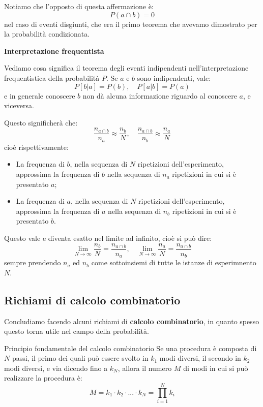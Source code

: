 \documentclass[a4paper,11pt]{article}
\begin{document}
Notiamo che l'opposto di questa affermazione è:
$$
P(a \cap b) = 0
$$
nel caso di eventi disgiunti, che era il primo teorema che avevamo dimostrato per la probabilità condizionata. 

\par\smallskip

\noindent
\textbf{\textsf{Interpretazione frequentista}}

\noindent
Vediamo cosa significa il teorema degli eventi indipendenti nell'interpretazione frequentistica della probabilità $P$. Se $a$ e $b$ sono indipendenti, vale:
$$
P[b | a] = P(b), \quad P[a | b] = P(a)
$$
e in generale conoscere $b$ non dà alcuna informazione riguardo al conoscere $a$, e viceversa.

Questo significherà che:
$$
\frac{n_{a \cap b}}{n_a} \approx \frac{n_b}{N}, \quad \frac{n_{a \cap b}}{n_b} \approx \frac{n_a}{N}
$$
cioè rispettivamente:
\begin{itemize}
	\item La frequenza di $b$, nella sequenza di $N$ ripetizioni dell’esperimento, approssima la frequenza di $b$ nella sequenza di $n_a$ ripetizioni in cui si è presentato $a$;
	\item La frequenza di $a$, nella sequenza di $N$ ripetizioni dell’esperimento, approssima la frequenza di $a$ nella sequenza di $n_b$ ripetizioni in cui si è presentato $b$.
\end{itemize}

Questo vale e diventa esatto nel limite ad infinito, cioè si può dire:
$$
\lim_{N \rightarrow \infty} \frac{n_b}{N} = \frac{n_{a \cap b}}{n_a}, \quad \lim_{N \rightarrow \infty} \frac{n_a}{N} = \frac{n_{a \cap b}}{n_b}
$$
sempre prendendo $n_a$ ed $n_b$ come sottoinsiemi di tutte le istanze di esperimnento $N$.

\subsection{Richiami di calcolo combinatorio}
Concludiamo facendo alcuni richiami di \textbf{calcolo combinatorio}, in quanto spesso questo torna utile nel campo della probabilità.

\begin{definition}{Principio fondamentale del calcolo combinatorio}
Se una procedura è composta di $N$ passi, il primo dei quali può essere svolto in $k_1$ modi diversi, il secondo in $k_2$ modi diversi, e via dicendo fino a $k_N$, allora il numero $M$ di modi in cui si può realizzare la procedura è:
$$
M = k_1 \cdot k_2 \cdot ... \cdot k_N = \prod_{i = 1}^N k_i
$$
\end{definition}
\end{document}
